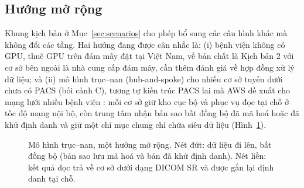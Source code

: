 \subsection{Hướng mở rộng}
\label{sec:hub}

Khung kịch bản ở Mục~\ref{sec:scenarios} cho phép bổ sung các cấu hình khác mà không
đổi các tầng. Hai hướng đang được cân nhắc là: (i) bệnh viện không có GPU, thuê GPU
trên đám mây đặt tại Việt Nam, về bản chất là Kịch bản 2 với cơ sở bên ngoài là nhà
cung cấp đám mây, cần thêm đánh giá về hợp đồng xử lý dữ liệu; và (ii) mô hình trục--nan
(hub-and-spoke) cho nhiều cơ sở tuyến dưới chưa có PACS (bối cảnh C), tương tự kiến
trúc PACS lai mà AWS đề xuất cho mạng lưới nhiều bệnh viện \cite{awspacs2026}: mỗi cơ sở
giữ kho cục bộ và phục vụ đọc tại chỗ ở tốc độ mạng nội bộ, còn trung tâm nhận bản sao
bất đồng bộ đã mã hoá hoặc đã khử định danh và giữ một chỉ mục chung chỉ chứa siêu dữ liệu
(Hình~\ref{fig:hubspoke}).

\begin{figure}[H]
\centering
{}
\caption{Mô hình trục--nan, một hướng mở rộng. Nét đứt: dữ liệu đi lên, bất đồng bộ
(bản sao lưu mã hoá và bản đã khử định danh). Nét liền: kết quả đọc trả về cơ sở dưới
dạng DICOM SR và được gắn lại định danh tại chỗ.}
\label{fig:hubspoke}
\end{figure}

